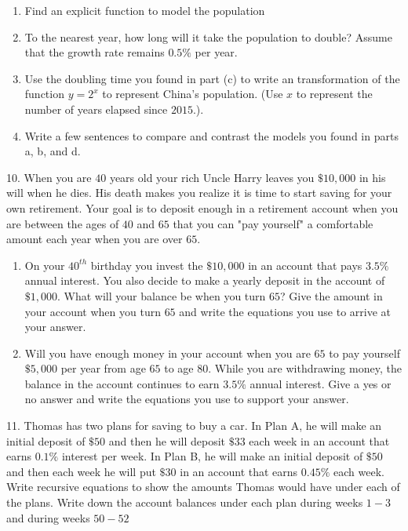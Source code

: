 \documentclass[10pt,]{book}
\theoremstyle{plain}
\theoremstyle{definition}
\theoremstyle{definition}
\theoremstyle{definition}
\numberwithin{equation}{section}
\begin{document}
\begin{exerciselist}
\begin{enumerate}[label=(\alph*)]
\item\hypertarget{li-59}{}Find an explicit function to model the population%
\item\hypertarget{li-60}{}To the nearest year, how long will it take the population to double? Assume that the growth rate remains \(0.5\%\) per year.%
\item\hypertarget{li-61}{}Use the doubling time you found in part (c) to write an transformation of the function \(y=2^x\) to represent China's population. (Use \(x\) to represent the number of years elapsed since \(2015\).).%
\item\hypertarget{li-62}{}Write a few sentences to compare and contrast the models you found in parts a, b, and d.%
\end{enumerate}
%
\par\smallskip
\item[10.]\hypertarget{exercise-29}{}\hypertarget{p-134}{}%
When you are \(40\) years old your rich Uncle Harry leaves you \(\$10,000\) in his will when he dies.  His death makes you realize it is time to start saving for your own retirement. Your goal is to deposit enough in a retirement account when you are between the ages of \(40\) and \(65\) that you can "pay yourself" a comfortable amount each year when you are over \(65\). \leavevmode%
\begin{enumerate}[label=(\alph*)]
\item\hypertarget{li-63}{}On your \(40^{th}\) birthday you invest the \(\$10,000\) in an account that pays \(3.5\%\) annual interest.  You also decide to make a yearly deposit in the account of \(\$1,000\). What will your balance be when you turn \(65\)?  Give the amount in your account when you turn \(65\) and write the equations you use to arrive at your answer.%
\item\hypertarget{li-64}{}Will you have enough money in your account when you are \(65\) to pay yourself \(\$5,000\) per year from age \(65\) to age \(80\).  While you are withdrawing money, the balance in the account continues to earn \(3.5\%\) annual interest.  Give a yes or no answer and write the equations you use to support your answer.%
\end{enumerate}
%
\par\smallskip
\item[11.]\hypertarget{exercise-30}{}\hypertarget{p-135}{}%
Thomas has two plans for saving to buy a car.  In Plan A, he will make an initial deposit of \(\$50\) and then he will deposit \(\$33\) each week in an account that earns \(0.1\%\) interest per week.  In Plan B, he will make an initial deposit of \(\$50\) and then each week he will put \(\$30\) in an account that earns \(0.45\%\) each week. Write recursive equations to show the amounts Thomas would have under each of the plans. Write down the account balances under each plan during weeks \(1 - 3\) and during weeks \(50 - 52\)%

\end{exerciselist}
\end{document}
